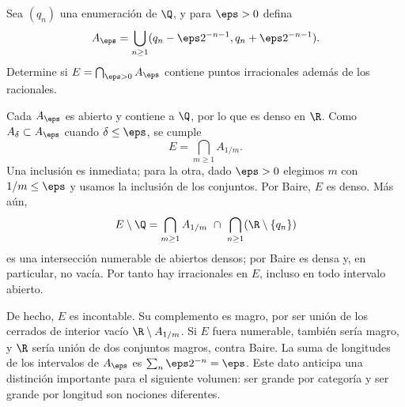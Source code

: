 \begin{ejercicio}
Sea $(q_n)$ una enumeración de $\Q$, y para $\eps>0$ defina
\[
 A_\eps=\bigcup_{n\geq1}(q_n-\eps2^{-n-1},q_n+\eps2^{-n-1}).
\]
Determine si $E=\bigcap_{\eps>0}A_\eps$ contiene puntos irracionales además de los racionales.
\end{ejercicio}
\begin{solucion}
Cada $A_\eps$ es abierto y contiene a $\Q$, por lo que es denso en $\R$. Como $A_\delta\subset A_\eps$ cuando $\delta\leq\eps$, se cumple
\[
 E=\bigcap_{m\geq1}A_{1/m}.
\]
Una inclusión es inmediata; para la otra, dado $\eps>0$ elegimos $m$ con $1/m\leq\eps$ y usamos la inclusión de los conjuntos. Por Baire, $E$ es denso. Más aún,
\[
 E\setminus\Q=\bigcap_{m\geq1}A_{1/m}\ \cap\ \bigcap_{n\geq1}(\R\setminus\{q_n\})
\]
es una intersección numerable de abiertos densos; por Baire es densa y, en particular, no vacía. Por tanto hay irracionales en $E$, incluso en todo intervalo abierto.

De hecho, $E$ es incontable. Su complemento es magro, por ser unión de los cerrados de interior vacío $\R\setminus A_{1/m}$. Si $E$ fuera numerable, también sería magro, y $\R$ sería unión de dos conjuntos magros, contra Baire. La suma de longitudes de los intervalos de $A_\eps$ es $\sum_n\eps2^{-n}=\eps$. Este dato anticipa una distinción importante para el siguiente volumen: ser grande por categoría y ser grande por longitud son nociones diferentes.
\end{solucion}

